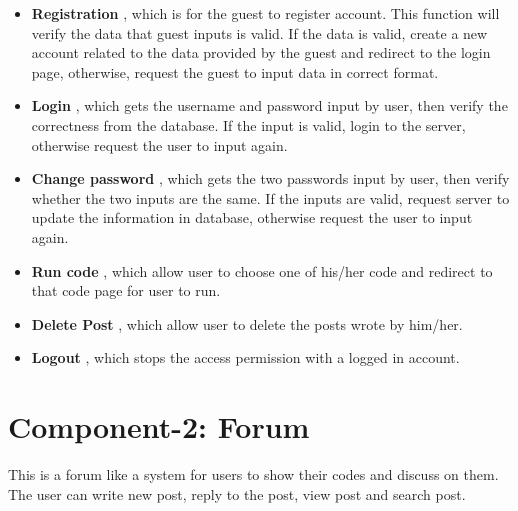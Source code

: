 \begin{itemize}

\item
\textbf{Registration}
, which is for the guest to register account. This function will verify the data that guest inputs is valid. If the data is valid, create a new account related to the data provided by the guest and redirect to the login page, otherwise, request the guest to input data in correct format.\newline

\item
\textbf{Login}
, which gets the username and password input by user, then verify the correctness from the database. If the input is valid, login to the server, otherwise request the user to input again.\newline

\item
\textbf{Change password}
, which gets the two passwords input by user, then verify whether the two inputs are the same. If the inputs are valid, request server to update the information in database, otherwise request the user to input again.\newline

\item
\textbf{Run code}
, which allow user to choose one of his/her code and redirect to that code page for user to run.

\item
\textbf{Delete Post}
, which allow user to delete the posts wrote by him/her.

\item
\textbf{Logout}
, which stops the access permission with a logged in account.

\end{itemize}
\clearpage

\section{Component-2: Forum}
This is a forum like a system for users to show their codes and discuss on them. The user can write new post, reply to the post, view post and search post.\newline

